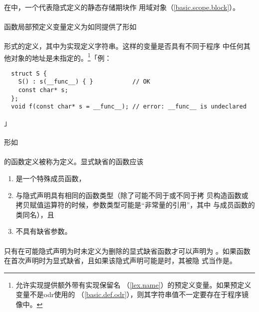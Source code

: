 \paragraph{}
在中，一个代表隐式定义的静态存储期块作
用域对象（\ref{basic.scope.block}）。

\paragraph{}
函数局部预定义变量定义为如同提供了形如                       \\
\mbox{\qquad{}\tm{\dq;}}                                            \\
形式的定义，其中为实现定义字符串。这样的变量是否具有不同于程序
中任何其他对象的地址是未指定的。\footnote{允许实现提供额外带有实现保留名
（\ref{lex.name}）的预定义变量。如果预定义变量不是odr使用的
（\ref{basic.def.odr}），则其字符串值不一定要存在于程序镜像中。}「例：
\begin{lstlisting}
  struct S {
    S() : s(__func__) { }           // OK
    const char* s;
  };
  void f(const char* s = __func__); // error: __func__ is undeclared
\end{lstlisting}」

\paragraph{}
形如                                                                          \\
\mbox{\qquad{} }                  \\
的函数定义被称为定义。显式缺省的函数应该
\begin{enumerate}
  \item{是一个特殊成员函数，}
  \item{与隐式声明具有相同的函数类型（除了可能不同于或不同于拷
    贝构造函数或拷贝赋值运算符的时候，参数类型可能是``非常量的引用''，其中
    与成员函数的类同名），且}
  \item{不具有缺省参数。}
\end{enumerate}

\paragraph{}
只有在可能隐式声明为时未定义为删除的显式缺省函数才可以声明为
。如果函数在首次声明时为显式缺省，且如果该隐式声明可能是时，其被隐
式当作是。

